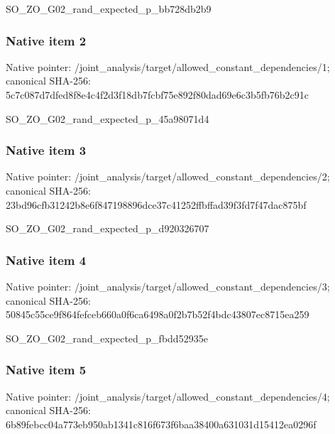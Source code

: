 \documentclass[10pt,a4paper]{article}
\begin{document}
\begingroup\raggedright\sloppy SO\_\allowbreak{}ZO\_\allowbreak{}G02\_\allowbreak{}rand\_\allowbreak{}expected\_\allowbreak{}p\_\allowbreak{}bb728db2b9\par\endgroup

\subsubsection{Native item 2}
Native pointer: /joint\_\allowbreak{}analysis/target/allowed\_\allowbreak{}constant\_\allowbreak{}dependencies/1; canonical SHA-256: 5c7c087d7dfed8f8e4c4f2d3f18db7fcbf75e892f80dad69e6c3b5fb76b2c91c

\begingroup\raggedright\sloppy SO\_\allowbreak{}ZO\_\allowbreak{}G02\_\allowbreak{}rand\_\allowbreak{}expected\_\allowbreak{}p\_\allowbreak{}45a98071d4\par\endgroup

\subsubsection{Native item 3}
Native pointer: /joint\_\allowbreak{}analysis/target/allowed\_\allowbreak{}constant\_\allowbreak{}dependencies/2; canonical SHA-256: 23bd96cfb31242b8e6f847198896dce37c41252ffbffad39f3fd7f47dac875bf

\begingroup\raggedright\sloppy SO\_\allowbreak{}ZO\_\allowbreak{}G02\_\allowbreak{}rand\_\allowbreak{}expected\_\allowbreak{}p\_\allowbreak{}d920326707\par\endgroup

\subsubsection{Native item 4}
Native pointer: /joint\_\allowbreak{}analysis/target/allowed\_\allowbreak{}constant\_\allowbreak{}dependencies/3; canonical SHA-256: 50845c55ce9f864fefceb660a0f6ca6498a0f2b7b52f4bdc43807ec8715ea259

\begingroup\raggedright\sloppy SO\_\allowbreak{}ZO\_\allowbreak{}G02\_\allowbreak{}rand\_\allowbreak{}expected\_\allowbreak{}p\_\allowbreak{}fbdd52935e\par\endgroup

\subsubsection{Native item 5}
Native pointer: /joint\_\allowbreak{}analysis/target/allowed\_\allowbreak{}constant\_\allowbreak{}dependencies/4; canonical SHA-256: 6b89febcc04a773eb950ab1341c816f673f6baa38400a631031d15412ea0296f
\end{document}
